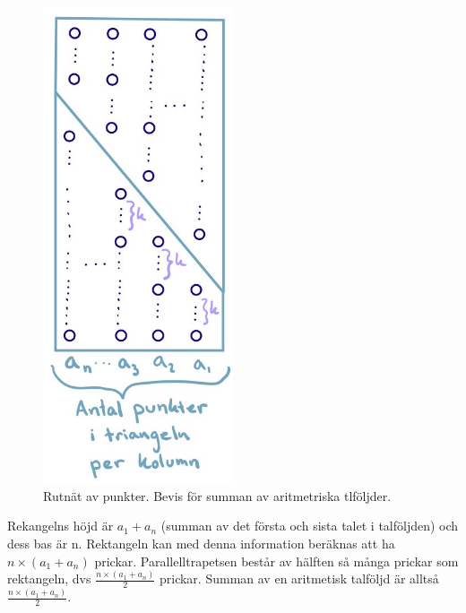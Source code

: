 \documentclass[nobib]{tufte-handout}
\begin{document}
\begin{example}
  \begin{figure}[h]
    \centering
    \includegraphics[width=0.5\textwidth]{graphics/86C79F60-B920-4AA3-A6CB-DEA00A8C58A6.jpeg}
    \caption{Rutnät av punkter. Bevis för summan av aritmetriska tlföljder. }
  \end{figure}
  
  Rekangelns höjd är $a_{1}+a_{n}$ (summan av det första och sista talet i talföljden) och dess bas är n. Rektangeln kan med denna information beräknas att ha $n\times(a_{1}+a_{n})$ prickar. Parallelltrapetsen består av hälften så många prickar som rektangeln, dvs $\frac{n\times(a_{1}+a_{n})}{2}$ prickar. Summan av en aritmetisk talföljd är alltså $\frac{n\times(a_{1}+a_{n})}{2}$.  
  
\end{example}
\end{document}
